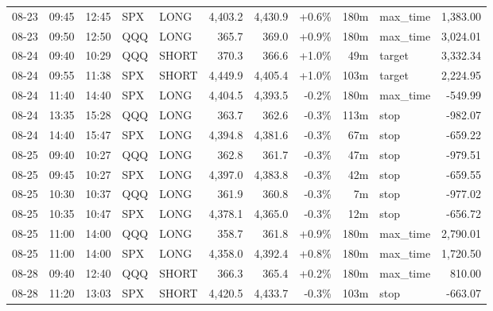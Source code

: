 \documentclass[11pt,a4paper,twoside]{article}
\begin{document}
\begin{center}
\begin{longtable}{>{\color{txtmain}}l l l l l r r r r >{\color{txtmain}}l r}
08-23 & 09:45 & 12:45 & SPX & LONG & 4,403.2 & 4,430.9 & \textcolor{wingreen}{+0.6\%} & 180m & max\_time & \textcolor{wingreen}{1,383.00} \\
08-23 & 09:50 & 12:50 & QQQ & LONG & 365.7 & 369.0 & \textcolor{wingreen}{+0.9\%} & 180m & max\_time & \textcolor{wingreen}{3,024.01} \\
08-24 & 09:40 & 10:29 & QQQ & SHORT & 370.3 & 366.6 & \textcolor{wingreen}{+1.0\%} & 49m & target & \textcolor{wingreen}{3,332.34} \\
08-24 & 09:55 & 11:38 & SPX & SHORT & 4,449.9 & 4,405.4 & \textcolor{wingreen}{+1.0\%} & 103m & target & \textcolor{wingreen}{2,224.95} \\
08-24 & 11:40 & 14:40 & SPX & LONG & 4,404.5 & 4,393.5 & \textcolor{lossred}{-0.2\%} & 180m & max\_time & \textcolor{lossred}{-549.99} \\
08-24 & 13:35 & 15:28 & QQQ & LONG & 363.7 & 362.6 & \textcolor{lossred}{-0.3\%} & 113m & stop & \textcolor{lossred}{-982.07} \\
08-24 & 14:40 & 15:47 & SPX & LONG & 4,394.8 & 4,381.6 & \textcolor{lossred}{-0.3\%} & 67m & stop & \textcolor{lossred}{-659.22} \\
08-25 & 09:40 & 10:27 & QQQ & LONG & 362.8 & 361.7 & \textcolor{lossred}{-0.3\%} & 47m & stop & \textcolor{lossred}{-979.51} \\
08-25 & 09:45 & 10:27 & SPX & LONG & 4,397.0 & 4,383.8 & \textcolor{lossred}{-0.3\%} & 42m & stop & \textcolor{lossred}{-659.55} \\
08-25 & 10:30 & 10:37 & QQQ & LONG & 361.9 & 360.8 & \textcolor{lossred}{-0.3\%} & 7m & stop & \textcolor{lossred}{-977.02} \\
08-25 & 10:35 & 10:47 & SPX & LONG & 4,378.1 & 4,365.0 & \textcolor{lossred}{-0.3\%} & 12m & stop & \textcolor{lossred}{-656.72} \\
08-25 & 11:00 & 14:00 & QQQ & LONG & 358.7 & 361.8 & \textcolor{wingreen}{+0.9\%} & 180m & max\_time & \textcolor{wingreen}{2,790.01} \\
08-25 & 11:00 & 14:00 & SPX & LONG & 4,358.0 & 4,392.4 & \textcolor{wingreen}{+0.8\%} & 180m & max\_time & \textcolor{wingreen}{1,720.50} \\
08-28 & 09:40 & 12:40 & QQQ & SHORT & 366.3 & 365.4 & \textcolor{wingreen}{+0.2\%} & 180m & max\_time & \textcolor{wingreen}{810.00} \\
08-28 & 11:20 & 13:03 & SPX & SHORT & 4,420.5 & 4,433.7 & \textcolor{lossred}{-0.3\%} & 103m & stop & \textcolor{lossred}{-663.07} \\

\end{longtable}
\end{center}
\end{document}
